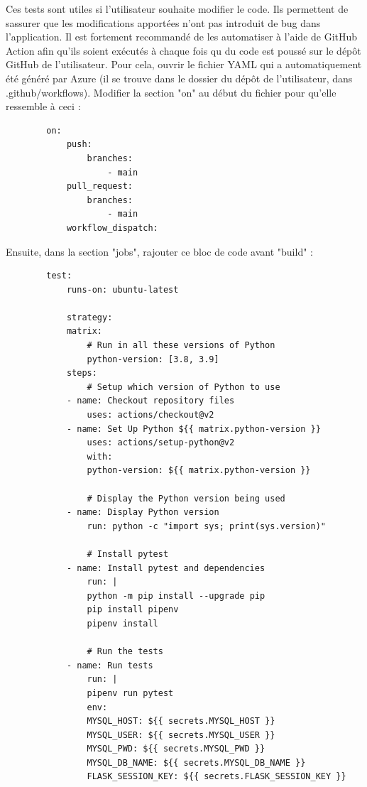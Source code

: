 \documentclass[french]{article}
\begin{document}
    Ces tests sont utiles si l'utilisateur souhaite modifier le code. Ils permettent de sassurer que les modifications apportées n'ont pas introduit de bug dans l'application. Il est fortement recommandé de les automatiser à l'aide de GitHub Action afin qu'ils soient exécutés à chaque fois qu du code est poussé sur le dépôt GitHub de l'utilisateur. Pour cela, ouvrir le fichier YAML qui a automatiquement été généré par Azure (il se trouve dans le dossier du dépôt de l'utilisateur, dans .github/workflows). Modifier la section "on" au début du fichier pour qu'elle ressemble à ceci :
    \begin{verbatim}
        on:
            push:
                branches:
                    - main
            pull_request:
                branches:
                    - main
            workflow_dispatch:  
    \end{verbatim}
    Ensuite, dans la section "jobs", rajouter ce bloc de code avant "build" :
    \begin{verbatim}
        test:
            runs-on: ubuntu-latest

            strategy:
            matrix:
                # Run in all these versions of Python
                python-version: [3.8, 3.9]
            steps:
                # Setup which version of Python to use
            - name: Checkout repository files
                uses: actions/checkout@v2
            - name: Set Up Python ${{ matrix.python-version }}
                uses: actions/setup-python@v2
                with:
                python-version: ${{ matrix.python-version }}

                # Display the Python version being used
            - name: Display Python version
                run: python -c "import sys; print(sys.version)"

                # Install pytest
            - name: Install pytest and dependencies
                run: |
                python -m pip install --upgrade pip
                pip install pipenv
                pipenv install

                # Run the tests
            - name: Run tests
                run: |
                pipenv run pytest
                env: 
                MYSQL_HOST: ${{ secrets.MYSQL_HOST }}
                MYSQL_USER: ${{ secrets.MYSQL_USER }}
                MYSQL_PWD: ${{ secrets.MYSQL_PWD }}
                MYSQL_DB_NAME: ${{ secrets.MYSQL_DB_NAME }}
                FLASK_SESSION_KEY: ${{ secrets.FLASK_SESSION_KEY }}
    \end{verbatim}
\end{document}
